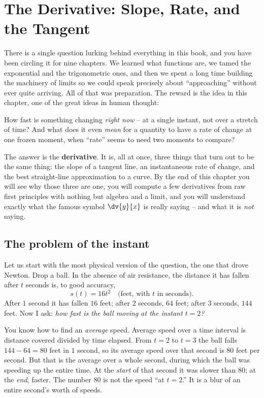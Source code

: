 \chapter{The Derivative: Slope, Rate, and the Tangent}

There is a single question lurking behind everything in this book, and you have
been circling it for nine chapters. We learned what functions are, we tamed the
exponential and the trigonometric ones, and then we spent a long time building
the machinery of limits so we could speak precisely about ``approaching'' without
ever quite arriving. All of that was preparation. The reward is the idea in this
chapter, one of the great ideas in human thought:

\begin{focusbox}
How fast is something changing \emph{right now} -- at a single instant, not over
a stretch of time? And what does it even \emph{mean} for a quantity to have a rate
of change at one frozen moment, when ``rate'' seems to need two moments to compare?
\end{focusbox}

The answer is the \textbf{derivative}. It is, all at once, three things that turn
out to be the same thing: the slope of a tangent line, an instantaneous rate of
change, and the best straight-line approximation to a curve. By the end of this
chapter you will see why those three are one, you will compute a few derivatives
from raw first principles with nothing but algebra and a limit, and you will
understand exactly what the famous symbol $\dv{y}{x}$ is really saying -- and what
it is \emph{not} saying.

\chapterline

\section{The problem of the instant}
\label{ch10:problem-of-instant}

Let us start with the most physical version of the question, the one that drove
Newton. Drop a ball. In the absence of air resistance, the distance it has fallen
after $t$ seconds is, to good accuracy,
\[
  s(t) = 16t^2 \quad \text{(feet, with $t$ in seconds).}
\]
After $1$ second it has fallen $16$ feet; after $2$ seconds, $64$ feet; after
$3$ seconds, $144$ feet. Now I ask: \emph{how fast is the ball moving at the
instant $t = 2$?}

You know how to find an \emph{average} speed. Average speed over a time interval
is distance covered divided by time elapsed. From $t = 2$ to $t = 3$ the ball
falls $144 - 64 = 80$ feet in $1$ second, so its average speed over that second
is $80$ feet per second. But that is the average over a whole second, during
which the ball was speeding up the entire time. At the \emph{start} of that second
it was slower than $80$; at the \emph{end}, faster. The number $80$ is not the
speed ``at $t = 2$.'' It is a blur of an entire second's worth of speeds.

